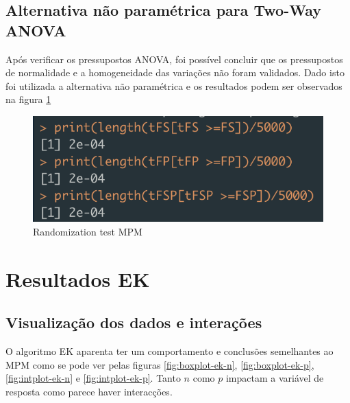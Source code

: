 \documentclass{uofa-eng-assignment}
\begin{document}
\subsection{Alternativa não paramétrica para Two-Way ANOVA}

Após verificar os pressupostos ANOVA, foi possível concluir que os pressupostos de normalidade e a homogeneidade das variações não foram validados. Dado isto foi utilizada a alternativa não paramétrica e os resultados podem ser observados na figura \ref{fig:randtest-mpm}

\begin{figure}[h]
    \centering
    \includegraphics[width=0.5\linewidth]{randomization_mpm.png}
    \caption{Randomization test MPM}
    \label{fig:randtest-mpm}
\end{figure}


\section{Resultados EK}

\subsection{Visualização dos dados e interações}

O algoritmo EK aparenta ter um comportamento e conclusões semelhantes ao MPM como se pode ver pelas figuras \ref{fig:boxplot-ek-n}, \ref{fig:boxplot-ek-p}, \ref{fig:intplot-ek-n} e \ref{fig:intplot-ek-p}. Tanto $n$ como $p$ impactam a variável de resposta como parece haver interacções.
\end{document}
